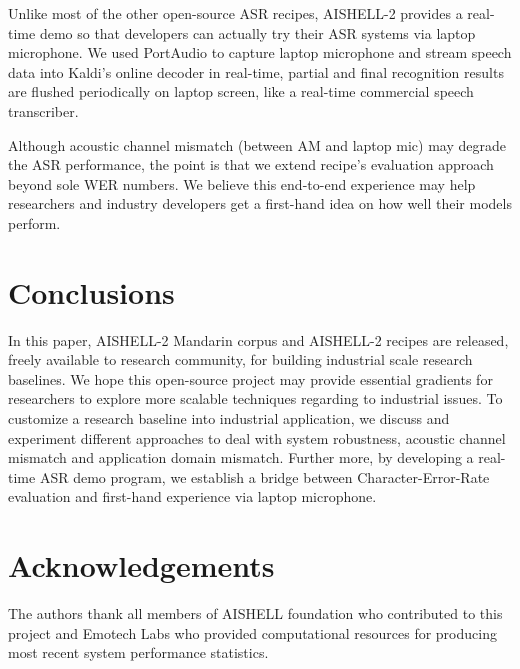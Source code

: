 \documentclass[a4paper]{article}
\begin{document}
Unlike most of the other open-source ASR recipes, AISHELL-2 provides a real-time
demo so that developers can actually try their ASR systems via laptop
microphone. We used PortAudio to capture laptop microphone and stream speech
data into Kaldi's online decoder in real-time, partial and final recognition
results are flushed periodically on laptop screen, like a real-time commercial
speech transcriber.

Although acoustic channel mismatch (between AM and laptop mic) may degrade the
ASR performance, the point is that we extend recipe's evaluation approach beyond
sole WER numbers. We believe this end-to-end experience may help researchers and
industry developers get a first-hand idea on how well their models perform.

\section{Conclusions}

In this paper, AISHELL-2 Mandarin corpus and AISHELL-2 recipes are released,
freely available to research community, for building industrial scale research
baselines. We hope this open-source project may provide essential gradients for
researchers to explore more scalable techniques regarding to industrial
issues. To customize a research baseline into industrial application, we discuss
and experiment different approaches to deal with system robustness, acoustic
channel mismatch and application domain mismatch. Further more, by developing
a real-time ASR demo program, we establish a bridge between Character-Error-Rate
evaluation and first-hand experience via laptop microphone.

\section{Acknowledgements}

The authors thank all members of AISHELL foundation who contributed to this
project and Emotech Labs who provided computational resources for producing most recent system performance statistics.




\end{document}
